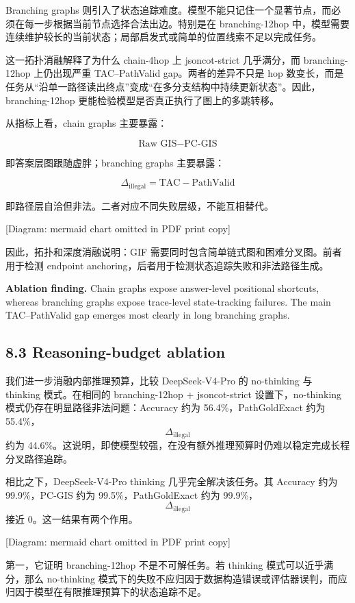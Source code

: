 \documentclass[
  11pt,
]{article}
\begin{document}
Branching graphs
则引入了状态追踪难度。模型不能只记住一个显著节点，而必须在每一步根据当前节点选择合法出边。特别是在
branching-12hop
中，模型需要连续维护较长的当前状态；局部启发式或简单的位置线索不足以完成任务。

这一拓扑消融解释了为什么 chain-4hop 上 jsoncot-strict 几乎满分，而
branching-12hop 上仍出现严重 TAC--PathValid gap。两者的差异不只是 hop
数变长，而是任务从``沿单一路径读出终点''变成``在多分支结构中持续更新状态''。因此，branching-12hop
更能检验模型是否真正执行了图上的多跳转移。

从指标上看，chain graphs 主要暴露：

\[
\text{Raw GIS} - \text{PC-GIS}  
\]

即答案层图跟随虚胖；branching graphs 主要暴露：

\[
\Delta_{\text{illegal}} = \text{TAC} - \text{PathValid}  
\]

即路径层自洽但非法。二者对应不同失败层级，不能互相替代。

{[}Diagram: mermaid chart omitted in PDF print copy{]}

因此，拓扑和深度消融说明：GIF
需要同时包含简单链式图和困难分叉图。前者用于检测 endpoint
anchoring，后者用于检测状态追踪失败和非法路径生成。

\textbf{Ablation finding.} Chain graphs expose answer-level positional
shortcuts, whereas branching graphs expose trace-level state-tracking
failures. The main TAC--PathValid gap emerges most clearly in long
branching graphs.

\subsection{8.3 Reasoning-budget
ablation}\label{reasoning-budget-ablation}

我们进一步消融内部推理预算，比较 DeepSeek-V4-Pro 的 no-thinking 与
thinking 模式。在相同的 branching-12hop + jsoncot-strict
设置下，no-thinking 模式仍存在明显路径非法问题：Accuracy 约为
56.4\%，PathGoldExact 约为 55.4\%，\[\Delta_{\text{illegal}}\] 约为
44.6\%。这说明，即使模型较强，在没有额外推理预算时仍难以稳定完成长程分叉路径追踪。

相比之下，DeepSeek-V4-Pro thinking 几乎完全解决该任务。其 Accuracy 约为
99.9\%，PC-GIS 约为 99.5\%，PathGoldExact 约为
99.9\%，\[\Delta_{\text{illegal}}\] 接近 0。这一结果有两个作用。

{[}Diagram: mermaid chart omitted in PDF print copy{]}

第一，它证明 branching-12hop 不是不可解任务。若 thinking
模式可以近乎满分，那么 no-thinking
模式下的失败不应归因于数据构造错误或评估器误判，而应归因于模型在有限推理预算下的状态追踪不足。
\end{document}
